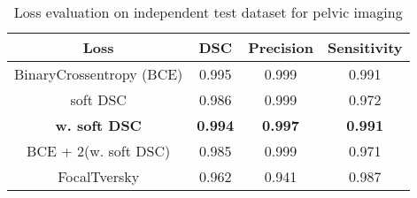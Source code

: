 \begin{table}[h]
\footnotesize
\caption{Loss evaluation on independent test dataset for pelvic imaging}
\centering
\begin{tabular}{c c c c}
\hline\hline
Loss & DSC & Precision & Sensitivity \\ [0.5ex]
\hline
BinaryCrossentropy (BCE) & 0.995 & 0.999 & 0.991 \\
soft DSC & 0.986 & 0.999 & 0.972 \\
\textbf{w. soft DSC} & \textbf{0.994} & \textbf{0.997} & \textbf{0.991} \\
BCE + 2(w. soft DSC) & 0.985 & 0.999 & 0.971 \\
FocalTversky & 0.962 & 0.941 & 0.987 \\
\hline\hline
\end{tabular}
\label{table:loss_prostate}
\end{table}
